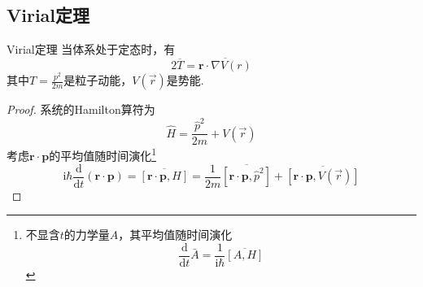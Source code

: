 \subsection{Virial定理}
\begin{question}{Virial定理}
    当体系处于定态时，有
    $$
        2\overline{T} = \overline{\boldsymbol{r}\cdot\nabla{V(r)}}
    $$
    其中$T=\frac{p^2}{2m}$是粒子动能，$V\left(\vec{r}\right)$是势能.
\end{question}
\begin{proof}
    系统的Hamilton算符为
    $$
        \hat{H}=\frac{\hat{p}^2}{2m}+V(\vec{r})
    $$
    考虑$\boldsymbol{r}\cdot\boldsymbol{p}$的平均值随时间演化\footnote{不显含$t$的力学量$A$，其平均值随时间演化
        $$
            \frac{\mathrm{d}}{\mathrm{d}t}\bar{A}=\frac{1}{\mathrm{i}\hbar}\overline{\left[A, H\right]}
        $$
    }
    $$
        \mathrm{i}\hbar\frac{\mathrm{d}}{\mathrm{d}t}(\boldsymbol{r}\cdot\boldsymbol{p})
        =\overline{\left[\boldsymbol{r}\cdot\boldsymbol{p}, H\right]}
        =\frac{1}{2m}\overline{\left[\boldsymbol{r}\cdot\boldsymbol{p}, \hat{p}^2\right]}+\overline{\left[\boldsymbol{r}\cdot\boldsymbol{p}, V(\vec{r})\right]}
    $$

\end{proof}
